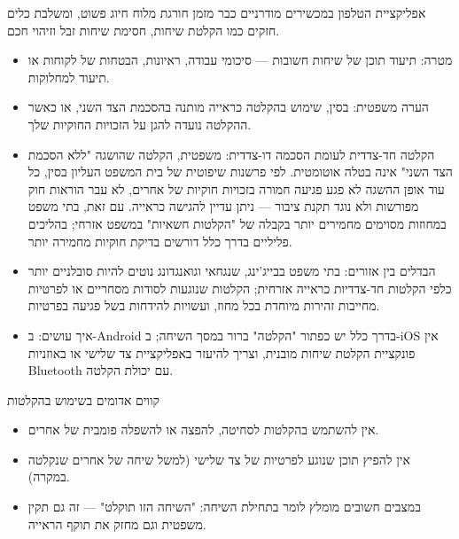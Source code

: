 


אפליקציית הטלפון במכשירים מודרניים כבר מזמן חורגת מלוח חיוג פשוט, ומשלבת כלים חזקים כמו הקלטת שיחות, חסימת שיחות זבל וזיהוי חכם.


\begin{itemize}
  \item מטרה: תיעוד תוכן של שיחות חשובות — סיכומי עבודה, ראיונות, הבטחות של לקוחות או תיעוד למחלוקות.
  \item הערה משפטית: בסין, שימוש בהקלטה כראייה מותנה בהסכמת הצד השני, או כאשר ההקלטה נועדה להגן על הזכויות החוקיות שלך.
  \item הקלטה חד-צדדית לעומת הסכמה דו-צדדית: משפטית, הקלטה שהושגה "ללא הסכמת הצד השני" אינה בטלה אוטומטית. לפי פרשנות שיפוטית של בית המשפט העליון בסין, כל עוד אופן ההשגה לא פגע פגיעה חמורה בזכויות חוקיות של אחרים, לא עבר הוראות חוק מפורשות ולא נוגד תקנת ציבור — ניתן עדיין להגישה כראייה. עם זאת, בתי משפט במחוזות מסוימים מחמירים יותר בקבלה של "הקלטות חשאיות" במשפט אזרחי; בהליכים פליליים בדרך כלל דורשים בדיקת חוקיות מחמירה יותר.
  \item הבדלים בין אזורים: בתי משפט בבייג'ינג, שנגחאי וגואנגדונג נוטים להיות סובלניים יותר כלפי הקלטות חד-צדדיות כראייה אזרחית; הקלטות שנוגעות לסודות מסחריים או לפרטיות מחייבות זהירות מיוחדת בכל מחוז, ועשויות להידחות בשל פגיעה בפרטיות.
  \item איך עושים: ב-Android בדרך כלל יש כפתור "הקלטה" ברור במסך השיחה; ב-iOS אין פונקציית הקלטת שיחות מובנית, וצריך להיעזר באפליקציית צד שלישי או באוזניות Bluetooth עם יכולת הקלטה.
\end{itemize}

\begin{tcbwarn}{קווים אדומים בשימוש בהקלטות}
\begin{itemize}
  \item אין להשתמש בהקלטות לסחיטה, להפצה או להשפלה פומבית של אחרים.
  \item אין להפיץ תוכן שנוגע לפרטיות של צד שלישי (למשל שיחה של אחרים שנקלטה במקרה).
  \item במצבים חשובים מומלץ לומר בתחילת השיחה: "השיחה הזו תוקלט" — זה גם תקין משפטית וגם מחזק את תוקף הראייה.
\end{itemize}

\end{tcbwarn}

